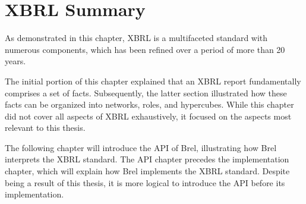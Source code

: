 \section{XBRL Summary}

As demonstrated in this chapter, XBRL is a multifaceted standard with numerous components,
which has been refined over a period of more than 20 years.

The initial portion of this chapter explained that an XBRL report fundamentally comprises a set of facts.
Subsequently, the latter section illustrated how these facts can be organized into networks, roles, and hypercubes.
While this chapter did not cover all aspects of XBRL exhaustively,
it focused on the aspects most relevant to this thesis.

The following chapter will introduce the API of Brel, 
illustrating how Brel interprets the XBRL standard.
The API chapter precedes the implementation chapter, which will explain how Brel implements the XBRL standard.
Despite being a result of this thesis, it is more logical to introduce the API before its implementation.
